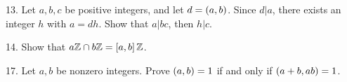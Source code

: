 \begin{mdframed}[style=darkAnswer,frametitle={Joe Starr}]
    
\end{mdframed}
\newpage
\begin{mdframed}[style=darkQuesion]
13. Let $a,b,c$  be positive integers, and let $d=\left(a,b\right)$. Since $d\vert a$, 
there exists an integer $h$ with $a=dh$. Show that $a\vert bc$, then $h\vert c$. 
\end{mdframed}

\begin{mdframed}[style=darkAnswer,frametitle={Joe Starr}]
    
\end{mdframed}
\newpage
\begin{mdframed}[style=darkQuesion]
14. Show that $a\mathbb{Z} \cap b\mathbb{Z}=\left[a,b\right]\mathbb{Z}$.
\end{mdframed}

\begin{mdframed}[style=darkAnswer,frametitle={Joe Starr}]
    
\end{mdframed}
\newpage
\begin{mdframed}[style=darkQuesion]
17. Let $a,b$ be nonzero integers. Prove $\left(a,b\right)=1$ if and only if 
$\left(a+b,ab\right)=1$. 
\end{mdframed}

